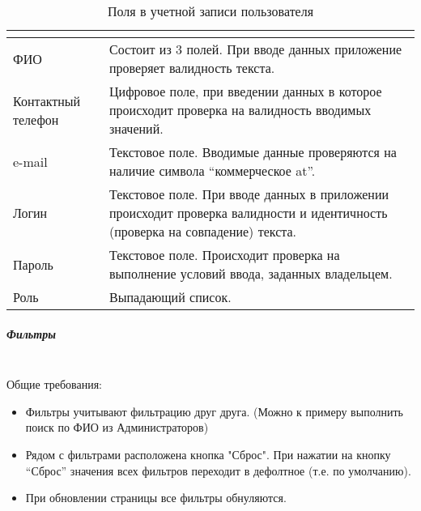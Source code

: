						\begin{table}[!h]
							\begin{center}
							\caption {Поля в учетной записи пользователя}
							\label{user_profile_table_of_fields}
							\setlength{\extrarowheight}{2mm}
							\begin{tabular}{|p{5cm}|p{10cm}|}
							\hline     \textbf{}&\textbf{} \\ [2mm]

							\hline  ФИО   & Состоит из 3 полей. При вводе данных приложение проверяет валидность текста. \\ [2mm]
							\hline  Контактный телефон  &  Цифровое поле, при введении данных в которое происходит проверка на валидность вводимых значений.\\ [2mm]
							\hline  e-mail  & Текстовое поле. Вводимые данные проверяются на наличие символа “коммерческое at”.\\ [2mm]
							\hline  Логин & Текстовое поле. При вводе данных в приложении происходит проверка валидности и идентичность (проверка на совпадение) текста.\\ [2mm]
							\hline  Пароль   & Текстовое поле. Происходит проверка на выполнение условий ввода, заданных владельцем. \\ [2mm]
							\hline  Роль & Выпадающий список.\\ [2mm]
							\hline
							\end{tabular}
							\end{center}
						\end{table}

					\subparagraph{Фильтры}\mbox{}\\

						Общие требования:
							\begin{itemize}
								\item Фильтры учитывают фильтрацию друг друга. (Можно к примеру выполнить поиск по ФИО из Администраторов)
								\item Рядом с фильтрами расположена кнопка "Сброс". При нажатии на кнопку “Сброс” значения всех фильтров переходит в дефолтное (т.е. по умолчанию).
								\item При обновлении страницы все фильтры обнуляются. 
							\end{itemize}

